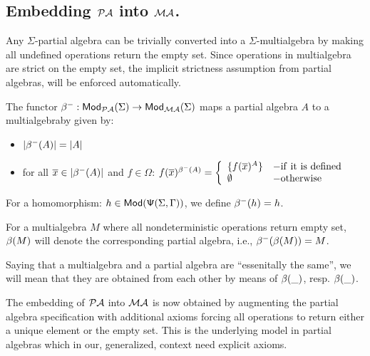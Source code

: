 \documentclass[10pt]{article}
\begin{document}
\subsection{Embedding ${\mathcal{PA}}$ into ${\mathcal{MA}}$.}\label{sub:emb}
Any $\Sigma$-partial algebra can be trivially converted into a
$\Sigma$-multialgebra by making all undefined operations return the empty
set. 
Since operations in multialgebra are strict on the empty set, the
implicit strictness assumption from partial algebras, will be enforced
automatically.
\begin{definition}\label{de:MP}
The functor ${\sf {\beta}}^-:{\sf {Mod}}_{{\mathcal{PA}}}(\Sigma)\to{\sf {Mod}}_{{\mathcal{MA}}}(\Sigma)$
maps a partial algebra $A$ to a multialgebraby given by:
\begin{itemize}\MyLPar
\item $|{\sf {\beta}}^-(A)|=|A|$
\item for all $\overline x\in |{\sf {\beta}}^-(A)|$ and $f\in\Omega$:
$f(\overline x)^{{\sf {\beta}}^{-}(A)}= \left\{\begin{array}{ll}\{f(\overline x)^A\} & - {\rm
if\ it\ is\ defined}\\
\emptyset & - {\rm otherwise} \end{array}\right.$
\end{itemize}
For a homomorphism:  $h \in {\sf {Mod}}({\sf {\Psi}}(\Sigma,\Gamma))$, we define ${\sf {\beta}}^-(h) = h$.

For a multialgebra $M$ where all nondeterministic operations return empty
set, ${\sf {\beta}}(M)$ will denote the
corresponding partial algebra, i.e., ${\sf {\beta}}^-({\sf {\beta}}(M))=M$.
\end{definition}
%
Saying that a multialgebra and a partial
algebra are ``essenitally the same'', we will
mean that they are obtained from each other by means of ${\sf {\beta}}(\_)$,
resp. ${\sf {\beta}}(\_)$.

The embedding of ${\mathcal{PA}}$ into ${\mathcal{MA}}$ is now obtained by 
augmenting the
partial algebra specification with additional axioms forcing all operations
to return either a unique element or the empty set. This is the underlying
model in partial algebras which in our, generalized, context need explicit
axioms. 
\end{document}
